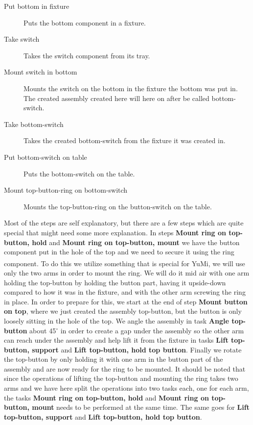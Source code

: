 \begin{description}
\item[Put bottom in fixture] Puts the bottom component in a fixture.

\item[Take switch] Takes the switch component from its tray.

\item[Mount switch in bottom] Mounts the switch on the bottom in the fixture the bottom was put in. The created assembly created here will here on after be called bottom-switch.

\item[Take bottom-switch] Takes the created bottom-switch from the fixture it was created in.

\item[Put bottom-switch on table] Puts the bottom-switch on the table.

\item[Mount top-button-ring on bottom-switch] Mounts the top-button-ring on the button-switch on the table.
\end{description}

\noindent Most of the steps are self explanatory, but there are a few steps which are quite special that might need some more explanation. In steps \textbf{Mount ring on top-button, hold} and \textbf{Mount ring on top-button, mount} we have the button component put in the hole of the top and we need to secure it using the ring component. To do this we utilize something that is special for YuMi\textsuperscript\textregistered, we will use only the two arms in order to mount the ring. We will do it mid air with one arm holding the top-button by holding the button part, having it upside-down compared to how it was in the fixture, and with the other arm screwing the ring in place. In order to prepare for this, we start at the end of step \textbf{Mount button on top}, where we just created the assembly top-button, but the button is only loosely sitting in the hole of the top. We angle the assembly in task \textbf{Angle top-button} about 45$^\circ$ in order to create a gap under the assembly so the other arm can reach under the assembly and help lift it from the fixture in tasks \textbf{Lift top-button, support} and \textbf{Lift top-button, hold top button}. Finally we rotate the top-button by only holding it with one arm in the button part of the assembly and are now ready for the ring to be mounted.
It should be noted that since the operations of lifting the top-button and mounting the ring takes two arms and we have here split the operations into two tasks each, one for each arm, the tasks \textbf{Mount ring on top-button, hold} and \textbf{Mount ring on top-button, mount} needs to be performed at the same time. The same goes for  \textbf{Lift top-button, support} and \textbf{Lift top-button, hold top button}.

